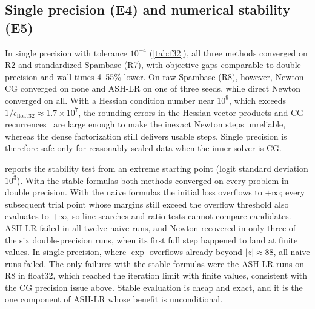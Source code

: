 \subsection{Single precision (E4) and numerical stability (E5)}
In single precision with tolerance $10^{-4}$ (\cref{tab:f32}), all three methods
converged on R2 and standardized Spambase (R7), with objective gaps comparable to
double precision and wall times 4--55\% lower. On raw Spambase (R8), however,
Newton--CG converged on none and ASH-LR on one of three seeds, while direct Newton
converged on all. With a Hessian condition number near $10^{9}$, which exceeds
$1/\epsilon_{\text{float32}}\approx1.7\times10^{7}$, the rounding errors in the
Hessian-vector products and CG recurrences~\cite{higham2022mixed} are large enough to make the inexact
Newton steps unreliable, whereas the dense factorization still delivers usable
steps. Single precision is therefore safe only for reasonably scaled data when the
inner solver is CG.

\begin{table}[t]
\centering
\caption{E4: float64 versus float32 (tolerance $10^{-4}$, three seeds). Median
relative gap of the returned solution evaluated in float64, and ratio of median wall
times.}\label{tab:f32}
\footnotesize

\end{table}

 reports the stability test from an extreme starting point (logit
standard deviation $10^3$). With the stable formulas both methods converged on every
problem in double precision. With the naive formulas the initial loss overflows to
$+\infty$; every subsequent trial point whose margins still exceed the overflow
threshold also evaluates to $+\infty$, so line searches and ratio tests cannot
compare candidates. ASH-LR failed in all twelve naive runs, and Newton recovered in
only three of the six double-precision runs, when its first full step happened to
land at finite values. In single precision, where $\exp$ overflows already beyond
$|z|\approx88$, all naive runs failed. The only failures with the stable formulas
were the ASH-LR runs on R8 in float32, which reached the iteration limit with finite
values, consistent with the CG precision issue above. Stable evaluation is cheap and
exact, and it is the one component of ASH-LR whose benefit is unconditional.

\begin{table}[t]
\centering
\caption{E5: seeds converged out of three from an extreme start (logit standard
deviation $10^3$) with stable and naive formulas.}\label{tab:stab}
\footnotesize

\end{table}

